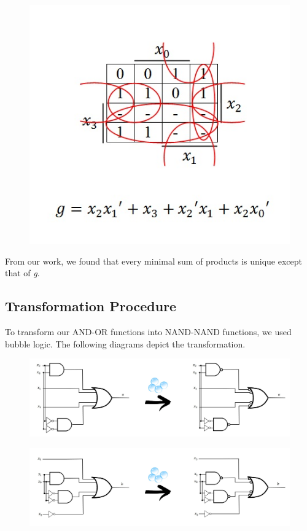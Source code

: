 \documentclass{article}
\begin{document}
\begin{figure}[h!]
\centering
\includegraphics[scale=0.6]{g-KMap}
\end{figure}

\pagebreak

From our work, we found that every minimal sum of products is unique except 
that of \textit{g}.


\subsection{Transformation Procedure}
To transform our AND-OR functions into NAND-NAND functions, we used bubble 
logic. The following diagrams depict the transformation.

\begin{figure}[hp]
\centering
\includegraphics[scale=0.25]{a-transformation}
\end{figure}

\begin{figure}[hp]
\centering
\includegraphics[scale=0.25]{b-transformation}
\end{figure}
\end{document}
